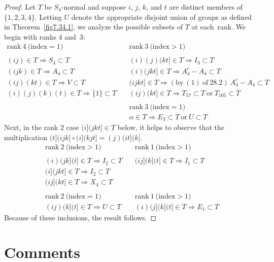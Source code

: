 \documentclass{surv-l}
\numberwithin{equation}{section}
\numberwithin{table}{section}
\numberwithin{figure}{section}
\theoremstyle{plain}
\theoremstyle{definition}
\begin{document}
\begin{proof}Let $T$ be $S_{4}$-normal and suppose $i$, $j$, $k$, and $t$
are distinct members of $\{1,2,3,4\}$. Letting $U$ denote the
appropriate disjoint union of groups as defined in
Theorem~\ref{fig7.34.1}, we analyze the possible subsets of $T$ at
each~rank. We begin with ranks 4 and~3:
\[
\begin{array}{ll}
\mathrm{rank\ 4\ (index} =1) &\quad\mathrm{rank\ 3\ (index} >1) \\
 &\\
(ij)\in T\Rightarrow S_{4}\subset T &\quad(i) (j) (kt]\in
T\Rightarrow I_{3}\subset T \\
(ijk)\in T\Rightarrow A_{4}\subset T &\quad(i) (jkt]\in T\Rightarrow
A_{4}^{c}-A_{4}\subset T \\
(ij)(kt)\in T\Rightarrow V\subset T &\quad(ijkt] \in
T\Rightarrow \mathrm{(by\ (1)\ of\ 28.2)}\ A_{4}^{c}-A_{4}\subset T \\
(i)(j)(k)(t)\in T\Rightarrow\{1\}\subset T &\quad(ij)(kt]\in T\Rightarrow T_{57}\subset T\ \mathrm{or}\ T_{105}\subset T  \\
&\\
&\quad\mathrm{rank\ 3\ (index} =1) \\
&\quad\alpha\in T\Rightarrow E_{3}\subset T\ \mathrm{or}\ U\subset T
\end{array}
\]
Next, in the rank 2 case $(i](jkt]\in T$ below, it helps to
observe that the multiplication $(t](ijk]\circ (i](kjt]=(j) (it]
(k]$.
\[
\begin{array}{ll}
\mathrm{rank\ 2\ (index} >1) &\quad \mathrm{rank\ 1\ (index} >1) \\
 & \\
(i)(jk](t]\in T\Rightarrow I_{2}\subset T &\quad (ij](k](t]\in T\Rightarrow I_{1}\subset T \\
(i](jkt]\in T\Rightarrow I_{2}\subset T &  \\
(ij](kt]\in T\Rightarrow X_{4}\subset T & \\
&\\
\mathrm{rank\ 2\ (index} =1) &\quad\mathrm{rank\ 1\ (index} >1) \\
(ij)(k](t]\in T\Rightarrow U\subset T &\quad(i)(j](k](t]\in T\Rightarrow E_{1}\subset T
\end{array}
\]
Because of these inclusions, the result follows.
\end{proof}

\section{Comments}\label{sec7.35}
\end{document}
